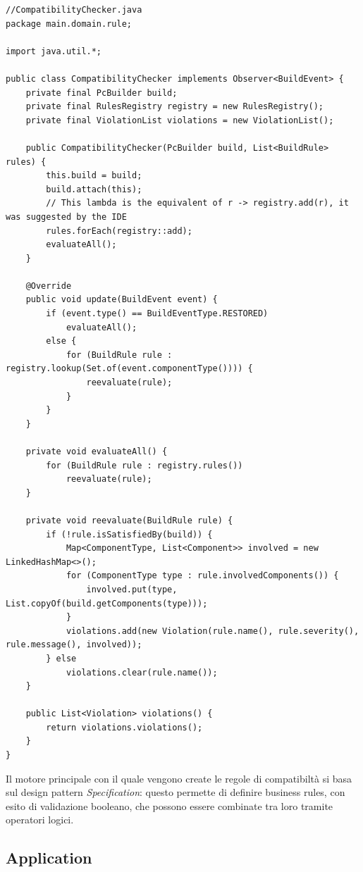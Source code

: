 \documentclass[12pt,a4paper]{article}
\begin{document}
\begin{lstlisting}[style=intellijlight, caption={A simple Java class}, label={lst:hello}]
//CompatibilityChecker.java
package main.domain.rule;

import java.util.*;

public class CompatibilityChecker implements Observer<BuildEvent> {
    private final PcBuilder build;
    private final RulesRegistry registry = new RulesRegistry();
    private final ViolationList violations = new ViolationList();

    public CompatibilityChecker(PcBuilder build, List<BuildRule> rules) {
        this.build = build;
        build.attach(this);
        // This lambda is the equivalent of r -> registry.add(r), it was suggested by the IDE
        rules.forEach(registry::add);
        evaluateAll();
    }

    @Override
    public void update(BuildEvent event) {
        if (event.type() == BuildEventType.RESTORED)
            evaluateAll();
        else {
            for (BuildRule rule : registry.lookup(Set.of(event.componentType()))) {
                reevaluate(rule);
            }
        }
    }

    private void evaluateAll() {
        for (BuildRule rule : registry.rules())
            reevaluate(rule);
    }

    private void reevaluate(BuildRule rule) {
        if (!rule.isSatisfiedBy(build)) {
            Map<ComponentType, List<Component>> involved = new LinkedHashMap<>();
            for (ComponentType type : rule.involvedComponents()) {
                involved.put(type, List.copyOf(build.getComponents(type)));
            }
            violations.add(new Violation(rule.name(), rule.severity(), rule.message(), involved));
        } else
            violations.clear(rule.name());
    }

    public List<Violation> violations() {
        return violations.violations();
    }
}

\end{lstlisting}

Il motore principale con il quale vengono create le regole di compatibiltà si basa sul design pattern \textit{Specification}: questo permette di definire business rules, con esito di validazione booleano, che possono essere combinate tra loro tramite operatori logici.

\subsection{Application}
\end{document}
